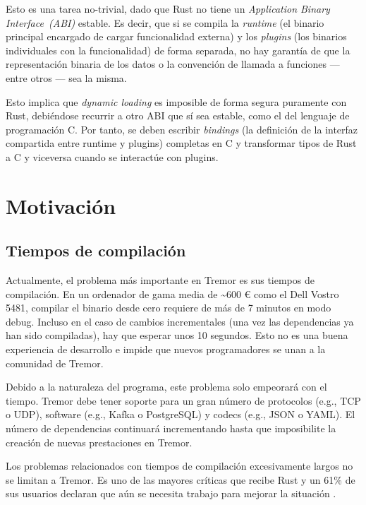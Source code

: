 Esto es una tarea no-trivial, dado que Rust no tiene un \emph{Application Binary
Interface~(ABI)} estable. Es decir, que si se compila la \emph{runtime} (el
binario principal encargado de cargar funcionalidad externa) y los
\emph{plugins} (los binarios individuales con la funcionalidad) de forma
separada, no hay garantía de que la representación binaria de los datos o la
convención de llamada a funciones --- entre otros --- sea la misma.

Esto implica que \emph{dynamic loading} es imposible de forma segura puramente
con Rust, debiéndose recurrir a otro ABI que sí sea estable, como el del
lenguaje de programación C. Por tanto, se deben escribir \emph{bindings} (la
definición de la interfaz compartida entre runtime y plugins) completas en C y
transformar tipos de Rust a C y viceversa cuando se interactúe con plugins.

\section{Motivación}

\subsection{Tiempos de compilación}

Actualmente, el problema más importante en Tremor es sus tiempos de compilación.
En un ordenador de gama media de \~{}600 € como el Dell Vostro 5481, compilar el
binario  desde cero requiere de más de 7 minutos en modo debug.
Incluso en el caso de cambios incrementales (una vez las dependencias ya han
sido compiladas), hay que esperar unos 10 segundos. Esto no es una buena
experiencia de desarrollo e impide que nuevos programadores se unan a la
comunidad de Tremor.

Debido a la naturaleza del programa, este problema solo empeorará con el tiempo.
Tremor debe tener soporte para un gran número de protocolos (e.g., TCP o UDP),
software (e.g., Kafka o PostgreSQL) y codecs (e.g., JSON o YAML). El número de
dependencias continuará incrementando hasta que imposibilite la creación de
nuevas prestaciones en Tremor.

Los problemas relacionados con tiempos de compilación excesivamente largos no se
limitan a Tremor. Es uno de las mayores críticas que recibe Rust y un 61\% de
sus usuarios declaran que aún se necesita trabajo para mejorar la situación
\cite{rustsurvey}.

